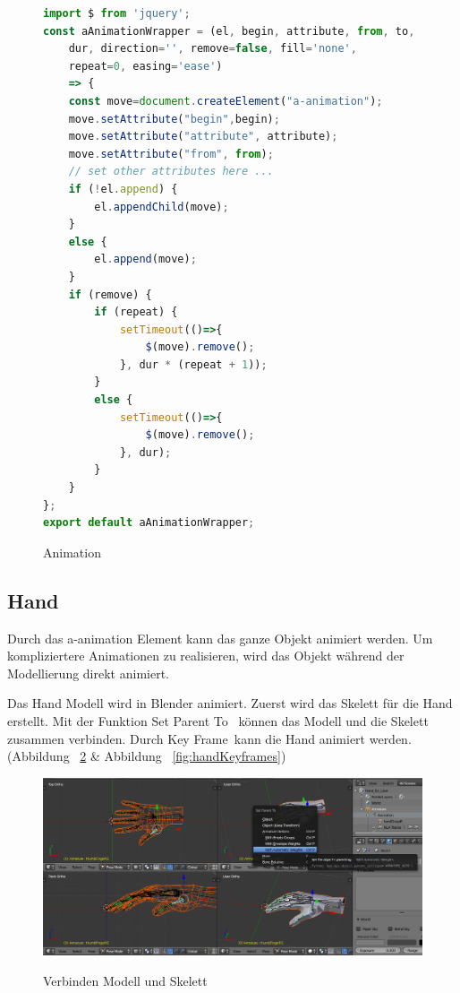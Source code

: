 \begin{figure}[ht]
\vspace*{1em}
\centering
\caption[Animation]{Animation}
\begin{lstlisting}[language=JavaScript, style=htmlcssjs]
import $ from 'jquery';
const aAnimationWrapper = (el, begin, attribute, from, to,
    dur, direction='', remove=false, fill='none',
    repeat=0, easing='ease') 
    => {
    const move=document.createElement("a-animation");
    move.setAttribute("begin",begin);
    move.setAttribute("attribute", attribute);
    move.setAttribute("from", from);
    // set other attributes here ...
    if (!el.append) {
        el.appendChild(move);
    }
    else {
        el.append(move);
    }
    if (remove) {
        if (repeat) {
            setTimeout(()=>{
                $(move).remove();
            }, dur * (repeat + 1));
        }
        else {
            setTimeout(()=>{
                $(move).remove();
            }, dur);
        }
    }
};
export default aAnimationWrapper;
\end{lstlisting}
\label{fig:aAnimation} 
\end{figure}
 
 \subsection{Hand}
 
 Durch das {\selectfont a-animation} Element kann das ganze Objekt animiert werden. Um kompliziertere Animationen zu realisieren, wird das Objekt während der Modellierung direkt animiert.
 
 Das Hand Modell wird in Blender animiert. Zuerst wird das Skelett für die Hand erstellt. Mit der Funktion \glqq Set Parent To \grqq\ können das Modell und die Skelett zusammen verbinden. Durch \glqq Key Frame\grqq\ kann die Hand animiert werden. (Abbildung ~\ref{fig:handSetParentTo} \& Abbildung ~\ref{fig:handKeyframes})
 
\begin{figure}[ht]
\vspace*{1em}
\centering
\caption[Verbinden Modell und Skelett]{Verbinden Modell und Skelett}
\includegraphics[width=\textwidth]{images/handSetParentTo.png}
\label{fig:handSetParentTo} 
\end{figure}

